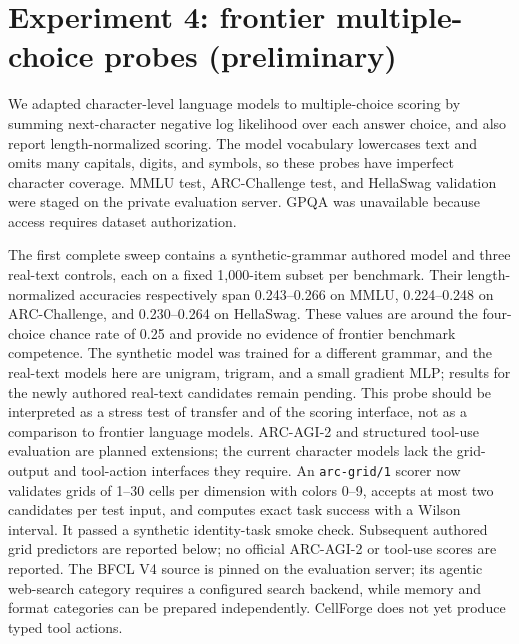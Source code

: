 \documentclass[11pt]{article}
\begin{document}
\section{Experiment 4: frontier multiple-choice probes (preliminary)}\label{sec:frontier}
We adapted character-level language models to multiple-choice scoring by summing
next-character negative log likelihood over each answer choice, and also report
length-normalized scoring. The model vocabulary lowercases text and omits many
capitals, digits, and symbols, so these probes have imperfect character coverage.
MMLU test, ARC-Challenge test, and HellaSwag validation were staged on the private
evaluation server. GPQA was unavailable because access requires dataset authorization.

The first complete sweep contains a synthetic-grammar authored model and three
real-text controls, each on a fixed 1{,}000-item subset per benchmark. Their
length-normalized accuracies respectively span 0.243--0.266 on MMLU,
0.224--0.248 on ARC-Challenge, and 0.230--0.264 on HellaSwag. These values are
around the four-choice chance rate of 0.25 and provide no evidence of frontier
benchmark competence. The synthetic model was trained for a different grammar,
and the real-text models here are unigram, trigram, and a small gradient MLP;
results for the newly authored real-text candidates remain pending. This probe
should be interpreted as a stress test of transfer and of the scoring interface,
not as a comparison to frontier language models.
ARC-AGI-2 and structured tool-use evaluation are planned extensions; the
current character models lack the grid-output and tool-action interfaces they
require. An \texttt{arc-grid/1} scorer now validates grids of 1--30 cells per
dimension with colors 0--9, accepts at most two candidates per test input,
and computes exact task success with a Wilson interval. It passed a synthetic
identity-task smoke check. Subsequent authored grid predictors are reported below; no official ARC-AGI-2
or tool-use scores are reported. The BFCL V4 source is pinned on the evaluation
server; its agentic web-search category requires a configured search backend,
while memory and format categories can be prepared independently. CellForge
does not yet produce typed tool actions.
\end{document}
